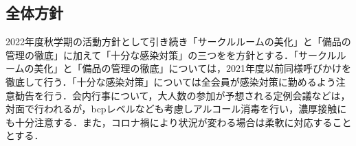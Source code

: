 \subsection*{全体方針}


2022年度秋学期の活動方針として引き続き「サークルルームの美化」と「備品の管理の徹底」に加えて「十分な感染対策」の三つをを方針とする．「サークルルームの美化」と「備品の管理の徹底」については，2021年度以前同様呼びかけを徹底して行う．「十分な感染対策」については全会員が感染対策に勤めるよう注意勧告を行う．会内行事について，大人数の参加が予想される定例会議などは，対面で行われるが，bcpレベルなども考慮しアルコール消毒を行い，濃厚接触にも十分注意する．また，コロナ禍により状況が変わる場合は柔軟に対応することとする．
